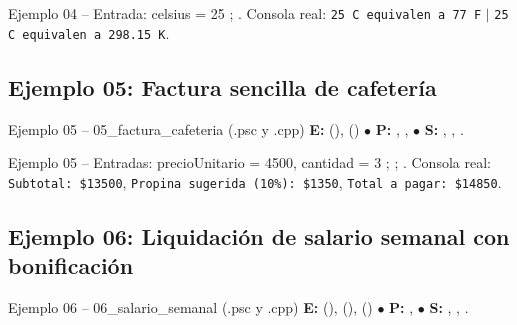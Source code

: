 \documentclass[11pt,letterpaper]{article}
\begin{document}



\begin{pruebaescritorio}{Ejemplo 04 -- Entrada: celsius = 25}
; . Consola real: \texttt{25 C equivalen a 77 F} $\mid$ \texttt{25 C equivalen a 298.15 K}.
\end{pruebaescritorio}

\subsection{Ejemplo 05: Factura sencilla de cafetería}
\begin{analisis}{Ejemplo 05 -- 05\_factura\_cafeteria (.psc y .cpp)}
\textbf{E:}  (),  () \quad $\bullet$ \textbf{P:} , ,  \quad $\bullet$ \textbf{S:} , , .
\end{analisis}




\begin{pruebaescritorio}{Ejemplo 05 -- Entradas: precioUnitario = 4500, cantidad = 3}
; ; . Consola real: \texttt{Subtotal: \$13500}, \texttt{Propina sugerida (10\%): \$1350}, \texttt{Total a pagar: \$14850}.
\end{pruebaescritorio}

\subsection{Ejemplo 06: Liquidación de salario semanal con bonificación}
\begin{analisis}{Ejemplo 06 -- 06\_salario\_semanal (.psc y .cpp)}
\textbf{E:}  (),  (),  () \quad $\bullet$ \textbf{P:} ,  \quad $\bullet$ \textbf{S:} , , .
\end{analisis}
\end{document}
